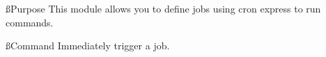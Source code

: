 
\ss{Purpose}
This module allows you to define jobs using cron express to run commands.

\ss{Command}
Immediately trigger a job.